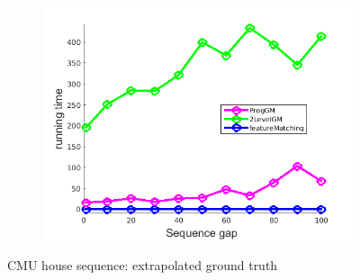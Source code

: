 \documentclass[
	fontsize=12pt,
	paper=a4,
	twoside=false,
	numbers=noenddot,
	plainheadsepline,
	toc=listof,
	toc=bibliography
]{scrartcl}
\begin{document}
\begin{figure}[h]
\begin{subfigure}[b]{0.3\textwidth}
	\end{subfigure} 
	\begin{subfigure}[b]{0.3\textwidth}
		\centering
		\includegraphics[scale=0.25]{"fig_ver2608/RealImages/House_seq/no_descr/using_cdf_afftrafo/solution/performance/time"}  
	\end{subfigure} 	
	\caption{CMU house sequence: extrapolated ground truth}
\end{figure}
\FloatBarrier
\vspace{-20pt}
\end{document}
